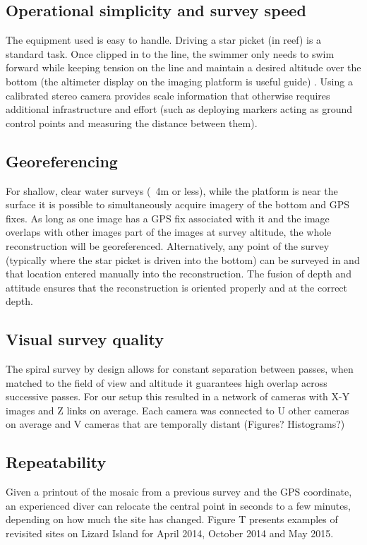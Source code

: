 \subsection{Operational simplicity and survey speed}
The equipment used is easy to handle. Driving a star picket (in reef) is a standard task. Once clipped in to the line, the swimmer only needs to swim forward while keeping tension on the line and maintain a desired altitude over the bottom (the altimeter display on the imaging platform is useful guide) .
Using a calibrated stereo camera provides scale information that otherwise requires additional infrastructure and effort (such as deploying markers acting as ground control points and measuring the distance between them).

\subsection{Georeferencing}
For shallow, clear water surveys (~4m or less), while the platform is near the surface it is possible to simultaneously acquire imagery of the bottom and GPS fixes. As long as one image has a GPS fix associated with it and the image overlaps with other images part of the images at survey altitude, the whole reconstruction will be georeferenced. Alternatively, any point of the survey (typically where the star picket is driven into the bottom) can be surveyed in and that location entered manually into the reconstruction.  
The fusion of depth and attitude ensures that the reconstruction is oriented properly and at the correct depth.

\subsection{Visual survey quality}
The spiral survey by design allows for constant separation between passes, when matched to the field of view and altitude it guarantees high overlap across successive passes. For our setup this resulted in a network of cameras with X-Y images and Z links on average. Each camera was connected to U other cameras on average and V cameras that are temporally distant (Figures? Histograms?)

\subsection{Repeatability}
Given a printout of the mosaic from a previous survey and the GPS coordinate, an experienced diver can relocate the central point in seconds to a few minutes, depending on how much the site has changed.
Figure T presents examples of revisited sites on Lizard Island for April 2014, October 2014 and May 2015.


    
  
  
